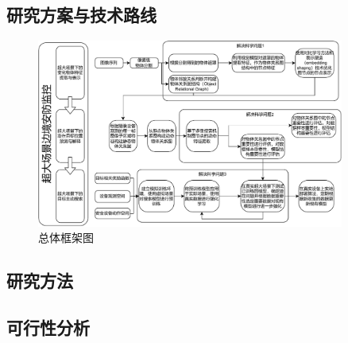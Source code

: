 \setlength{\abovedisplayskip}{0pt}
\setlength{\belowdisplayskip}{0pt}





\subsection{研究方案与技术路线}

\begin{figure}[h!]
\centering 

\includegraphics[width=0.9\textwidth]{figures/framework.pdf}

\captionsetup{justification=centering}
\caption{总体框架图}
\label{fig:framework}
\end{figure}

% 
% 
% 

\subsection{研究方法}

\subsection{可行性分析} 



